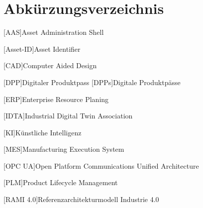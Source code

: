 \section*{Abkürzungsverzeichnis}
\begin{singlespacing}
\end{singlespacing}
\begin{acronym}

[AAS]{Asset Administration Shell}

[Asset-ID]{Asset Identifier}

[CAD]{Computer Aided Design}

[DPP]{Digitaler Produktpass}
[DPPs]{Digitale Produktpässe}

[ERP]{Enterprise Resource Planing}

[IDTA]{Industrial Digital Twin Association}

[KI]{Künstliche Intelligenz}

[MES]{Manufacturing Execution System}

[OPC UA]{Open Platform Communications Unified Architecture}

[PLM]{Product Lifecycle Management}

[RAMI 4.0]{Referenzarchitekturmodell Industrie 4.0}

\end{acronym}



\newpage